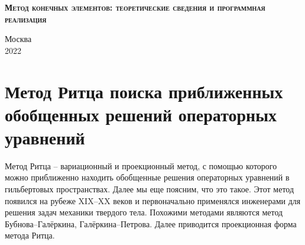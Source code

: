\documentclass[a4paper, 11pt]{article}
\begin{document}
\begin{titlepage}
	\newpage
	
	\begin{center}
	\end{center}
	
	\vspace{8em}
	
	\begin{center}
	\end{center}
	
	\vspace{2em}
	
	\begin{center}
		\textsc{\textbf{Метод конечных элементов: теоретические сведения и программная реализация}}
	\end{center}
	
	\vspace{6em}
	
	
	
	\newbox{\lbox}
	\savebox{\lbox}{\hbox{}}
	\newlength{\maxl}
	\setlength{\maxl}{\wd\lbox}
	\hfill\parbox{11cm}{
	}
	
	
	\vspace{\fill}
	
	\begin{center}
		Москва \\ 2022
	\end{center}
	
\end{titlepage}

\setcounter{MaxMatrixCols}{20}


\section{Метод Ритца поиска приближенных обобщенных решений операторных уравнений}
Метод Ритца -- вариационный и проекционный метод, с помощью которого можно приближенно находить обобщенные решения операторных уравнений в гильбертовых пространствах. Далее мы еще поясним, что это такое. Этот метод появился на рубеже XIX--XX веков и первоначально применялся инженерами для решения задач механики твердого тела. Похожими методами являются метод Бубнова--Галёркина, Галёркина--Петрова. Далее приводится проекционная форма метода Ритца.
\end{document}
